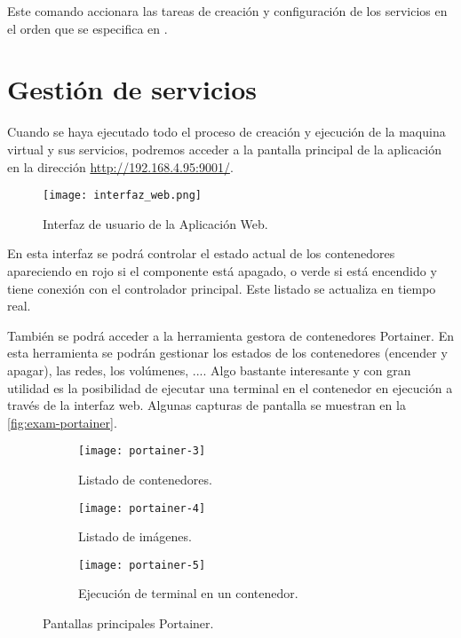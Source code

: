 \documentclass[../../main.tex]{subfiles}
\begin{document}
Este comando accionara las tareas de creación y configuración de los servicios en el orden que se especifica en .

\section{Gestión de servicios}

Cuando se haya ejecutado todo el proceso de creación y ejecución de la maquina virtual y sus servicios, podremos acceder a la pantalla principal de la aplicación en la dirección \href{http://192.168.4.95:9001/}{http://192.168.4.95:9001/}.

\begin{figure}[H]
     \centering
     \texttt{[image: interfaz\_web.png]}
     \caption{Interfaz de usuario de la Aplicación Web.}
     \label{img:interfaz-web-anexo}
 \end{figure}
 
 En esta interfaz se podrá controlar el estado actual de los contenedores apareciendo en rojo si el componente está apagado, o verde si está encendido y tiene conexión con el controlador principal. Este listado se actualiza en tiempo real.
 
 También se podrá acceder a la herramienta gestora de contenedores Portainer. En esta herramienta se podrán gestionar los estados de los contenedores (encender y apagar), las redes, los volúmenes, .... Algo bastante interesante y con gran utilidad es la posibilidad de ejecutar una terminal en el contenedor en ejecución a través de la interfaz web. Algunas capturas de pantalla se muestran en la \autoref{fig:exam-portainer}.
 
  \begin{figure}[H]
  \centering
  \begin{subfigure}[b]{\linewidth}
    \texttt{[image: portainer-3]}
    \caption{Listado de contenedores.}
  \end{subfigure}
  \begin{subfigure}[b]{0.50\linewidth}
    \texttt{[image: portainer-4]}
    \caption{Listado de imágenes.}
  \end{subfigure}\hfill
  \begin{subfigure}[b]{0.45\linewidth}
    \texttt{[image: portainer-5]}
    \caption{Ejecución de terminal en un contenedor.}
  \end{subfigure}
  \caption{Pantallas principales Portainer.}
  \label{fig:exam-portainer}
\end{figure}
 
\end{document}

